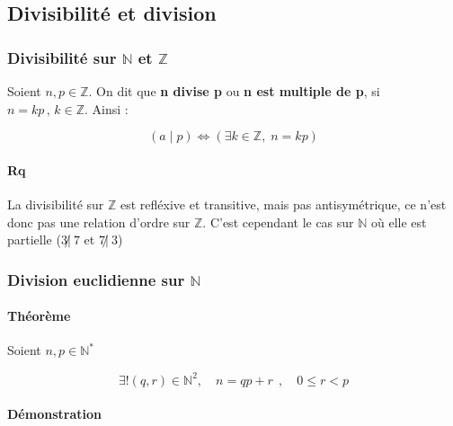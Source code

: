 \documentclass{report}
\newcommand{\N}{\mathbb{N}}
\newcommand{\Z}{\mathbb{Z}}
\begin{document}
    \subsection{Divisibilité et division}

      \subsubsection{Divisibilité sur $\N$ et $\Z$}

          Soient $n,p\in\Z$. On dit que \textbf{n divise p} ou \textbf{n est multiple de p}, si $n = kp \, , \, k\in\Z$. Ainsi : 

          \setlength{\fboxsep}{5pt} %
          \[
          \boxed{\left(a \mid p\right) \iff \left(\exists k \in \mathbb{Z}, \; n = kp\right)}
          \]

          \paragraph{Rq} La divisibilité sur $\Z$ est refléxive et transitive, mais pas antisymétrique, ce n'est donc pas une relation d'ordre sur $\Z$. C'est cependant le cas sur $\N$ où elle est partielle ($3\not|~7$ et $7\not|~3$)



      \subsubsection{Division euclidienne sur $\N$}

          \paragraph{Théorème} Soient $n,p\in\N^*$ 

            \[
              \boxed{\exists! (q,r) \in \mathbb{N}^2, \quad n = qp + r ~~, \quad 0\le r<p}
            \]

          \paragraph{Démonstration}~\\

          \setlength{\fboxsep}{4pt} %
\end{document}
